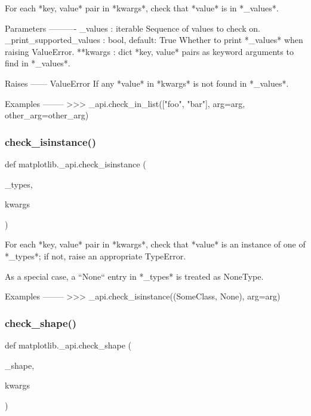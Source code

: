 \begin{DoxyVerb}For each *key, value* pair in *kwargs*, check that *value* is in *_values*.

Parameters
----------
_values : iterable
    Sequence of values to check on.
_print_supported_values : bool, default: True
    Whether to print *_values* when raising ValueError.
**kwargs : dict
    *key, value* pairs as keyword arguments to find in *_values*.

Raises
------
ValueError
    If any *value* in *kwargs* is not found in *_values*.

Examples
--------
>>> _api.check_in_list(["foo", "bar"], arg=arg, other_arg=other_arg)
\end{DoxyVerb}
 \mbox{\label{namespacematplotlib_1_1__api_a56e2f2b8c5d54d2312723b8393149355}} 
\subsubsection{\texorpdfstring{check\+\_\+isinstance()}{check\_isinstance()}}
{\footnotesize\ttfamily def matplotlib.\+\_\+api.\+check\+\_\+isinstance (\begin{DoxyParamCaption}\item[{}]{\+\_\+types,  }\item[{}]{kwargs }\end{DoxyParamCaption})}

\begin{DoxyVerb}For each *key, value* pair in *kwargs*, check that *value* is an instance
of one of *_types*; if not, raise an appropriate TypeError.

As a special case, a ``None`` entry in *_types* is treated as NoneType.

Examples
--------
>>> _api.check_isinstance((SomeClass, None), arg=arg)
\end{DoxyVerb}
 \mbox{\label{namespacematplotlib_1_1__api_aee2ab7522a67107f11c14ad87cdf19fc}} 
\subsubsection{\texorpdfstring{check\+\_\+shape()}{check\_shape()}}
{\footnotesize\ttfamily def matplotlib.\+\_\+api.\+check\+\_\+shape (\begin{DoxyParamCaption}\item[{}]{\+\_\+shape,  }\item[{}]{kwargs }\end{DoxyParamCaption})}

